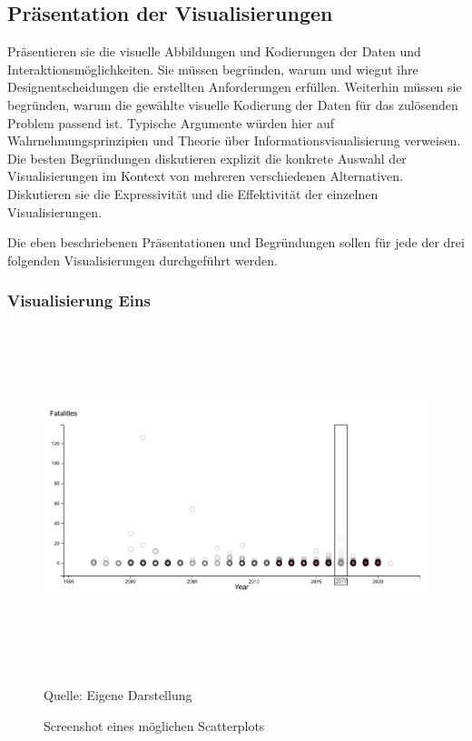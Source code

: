 \documentclass[usegeometry=true]{scrartcl}
\begin{document}
\subsection{Präsentation der Visualisierungen}
Präsentieren sie die visuelle Abbildungen und Kodierungen der Daten und Interaktionsmöglichkeiten. 
Sie müssen  begründen, warum und wiegut ihre Designentscheidungen die erstellten Anforderungen erfüllen. 
Weiterhin müssen sie begründen, warum die gewählte visuelle Kodierung der Daten für das zulösenden Problem passend ist. 
Typische Argumente würden hier auf Wahrnehmungsprinzipien und Theorie über Informationsvisualisierung verweisen. 
Die besten Begründungen diskutieren explizit die konkrete Auswahl der Visualisierungen im Kontext von mehreren verschiedenen Alternativen. Diskutieren sie die Expressivität und die Effektivität der einzelnen Visualisierungen.

Die eben beschriebenen Präsentationen und Begründungen sollen für jede der drei folgenden Visualisierungen durchgeführt werden. 
\subsubsection{Visualisierung Eins}

\begin{figure}[]
\begin{center}
\includegraphics[width=12cm,height=10cm,keepaspectratio]{Scatterplot.PNG}%
\caption{Screenshot eines möglichen Scatterplots}
Quelle: Eigene Darstellung
\label{scatterplot}
\end{center}
\end{figure}
\end{document}
